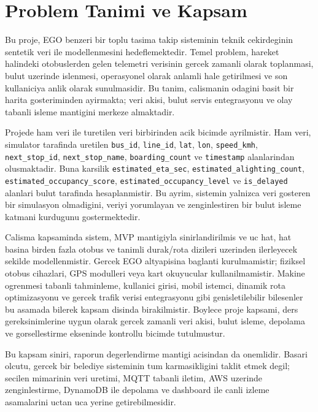 \section{Problem Tanimi ve Kapsam}

Bu proje, EGO benzeri bir toplu tasima takip sisteminin teknik cekirdeginin sentetik veri ile modellenmesini hedeflemektedir. Temel problem, hareket halindeki otobuslerden gelen telemetri verisinin gercek zamanli olarak toplanmasi, bulut uzerinde islenmesi, operasyonel olarak anlamli hale getirilmesi ve son kullaniciya anlik olarak sunulmasidir. Bu tanim, calismanin odagini basit bir harita gosteriminden ayirmakta; veri akisi, bulut servis entegrasyonu ve olay tabanli isleme mantigini merkeze almaktadir.

Projede ham veri ile turetilen veri birbirinden acik bicimde ayrilmistir. Ham veri, simulator tarafinda uretilen \texttt{bus\_id}, \texttt{line\_id}, \texttt{lat}, \texttt{lon}, \texttt{speed\_kmh}, \texttt{next\_stop\_id}, \texttt{next\_stop\_name}, \texttt{boarding\_count} ve \texttt{timestamp} alanlarindan olusmaktadir. Buna karsilik \texttt{estimated\_eta\_sec}, \texttt{estimated\_alighting\_count}, \texttt{estimated\_occupancy\_score}, \texttt{estimated\_occupancy\_level} ve \texttt{is\_delayed} alanlari bulut tarafinda hesaplanmistir. Bu ayrim, sistemin yalnizca veri gosteren bir simulasyon olmadigini, veriyi yorumlayan ve zenginlestiren bir bulut isleme katmani kurdugunu gostermektedir.

Calisma kapsaminda sistem, MVP mantigiyla sinirlandirilmis ve uc hat, hat basina birden fazla otobus ve tanimli durak/rota dizileri uzerinden ilerleyecek sekilde modellenmistir. Gercek EGO altyapisina baglanti kurulmamistir; fiziksel otobus cihazlari, GPS modulleri veya kart okuyucular kullanilmamistir. Makine ogrenmesi tabanli tahminleme, kullanici girisi, mobil istemci, dinamik rota optimizasyonu ve gercek trafik verisi entegrasyonu gibi genisletilebilir bilesenler bu asamada bilerek kapsam disinda birakilmistir. Boylece proje kapsami, ders gereksinimlerine uygun olarak gercek zamanli veri akisi, bulut isleme, depolama ve gorsellestirme ekseninde kontrollu bicimde tutulmustur.

Bu kapsam siniri, raporun degerlendirme mantigi acisindan da onemlidir. Basari olcutu, gercek bir belediye sisteminin tum karmasikligini taklit etmek degil; secilen mimarinin veri uretimi, MQTT tabanli iletim, AWS uzerinde zenginlestirme, DynamoDB ile depolama ve dashboard ile canli izleme asamalarini uctan uca yerine getirebilmesidir.
